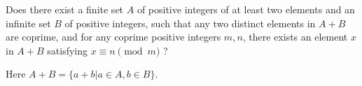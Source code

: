 Does there exist a finite set $A$ of positive integers of at least two elements and an infinite set $B$ of positive integers, such that any two distinct elements in $A+B$ are coprime, and for any coprime positive integers $m,n$, there exists an element $x$ in $A+B$ satisfying $x\equiv n \pmod m$ ?

Here $A+B=\{a+b|a\in A, b\in B\}$.